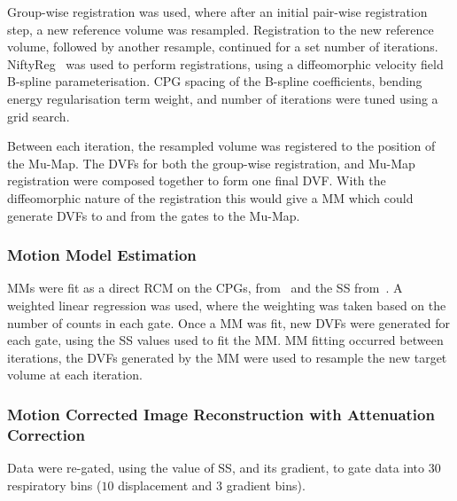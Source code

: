                 Group-wise registration was used, where after an initial pair-wise registration step, a new reference volume was resampled. Registration to the new reference volume, followed by another resample, continued for a set number of iterations. NiftyReg~\parencite{Modat2010} was used to perform registrations, using a diffeomorphic velocity field B-spline parameterisation. \gls{CPG} spacing of the B-spline coefficients, bending energy regularisation term weight, and number of iterations were tuned using a grid search.
                
                Between each iteration, the resampled volume was registered to the position of the \gls{Mu-Map}. The \glspl{DVF} for both the group-wise registration, and \gls{Mu-Map} registration were composed together to form one final \gls{DVF}. With the diffeomorphic nature of the registration this would give a \gls{MM} which could generate \glspl{DVF} to and from the gates to the \gls{Mu-Map}.
            
            \subsubsection{Motion Model Estimation} \label{sec:pet_ct_motion_correction_exploiting_motion_models_fit_on_coarsely_gated_data_applied_to_finely_gated_data_methods_motion_model_estimation}
                \glspl{MM} were fit as a direct \gls{RCM} on the \glspl{CPG}, from~ and the \gls{SS} from~. A weighted linear regression was used, where the weighting was taken based on the number of counts in each gate. Once a \gls{MM} was fit, new \glspl{DVF} were generated for each gate, using the \gls{SS} values used to fit the \gls{MM}. \gls{MM} fitting occurred between iterations, the \glspl{DVF} generated by the \gls{MM} were used to resample the new target volume at each iteration.
            
            \subsubsection{Motion Corrected Image Reconstruction with Attenuation Correction} \label{sec:pet_ct_motion_correction_exploiting_motion_models_fit_on_coarsely_gated_data_applied_to_finely_gated_data_methods_mc_image_reconstruction_with_ac}
                Data were re-gated, using the value of \gls{SS}, and its gradient, to gate data into $30$ respiratory bins ($10$ displacement and $3$ gradient bins).
                
